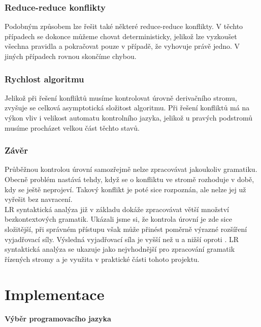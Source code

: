 \subsection{Reduce-reduce konflikty}
\label{subsec:reduceReduce}

Podobným způsobem lze řešit také některé reduce-reduce konflikty.
V těchto případech se dokonce můžeme chovat deterministicky,
jelikož lze vyzkoušet všechna pravidla a pokračovat pouze v případě,
že vyhovuje právě jedno. V jiných případech rovnou skončíme chybou.

\subsection{Rychlost algoritmu}
\label{subsec:speed}

Jelikož při řešení konfliktů musíme kontrolovat úrovně derivačního stromu,
zvyšuje se celková asymptotická složitost algoritmu. Při řešení konfliktů
má na výkon vliv i velikost automatu kontrolního jazyka, jelikož u pravých
podstromů musíme procházet velkou část těchto stavů.

\subsection*{Závěr}

Průběžnou kontrolou úrovní samozřejmě nelze zpracovávat jakoukoliv gramatiku.
Obecně problém nastává tehdy, když se o konfliktu ve stromě rozhoduje
v době, kdy se ještě neprojeví. Takový konflikt je poté sice rozpoznán,
ale nelze jej už vyřešit bez navracení.\\

LR syntaktická analýza již v základu dokáže zpracovávat větší množství
bezkontextových gramatik. Ukázali jsme si, že kontrola úrovní je zde
sice složitější, při správném přístupu však může přinést poměrně výrazné
rozšíření vyjadřovací síly. Výsledná vyjadřovací síla je vyšší než u
 a nižší oproti .
LR syntaktická analýza se ukazuje jako nejvhodnější pro zpracování
gramatik řízených stromy a je využita v praktické části tohoto projektu.\\

\chapter{Implementace}
\label{chap:Implementation}

\subsubsection*{Výběr programovacího jazyka}


